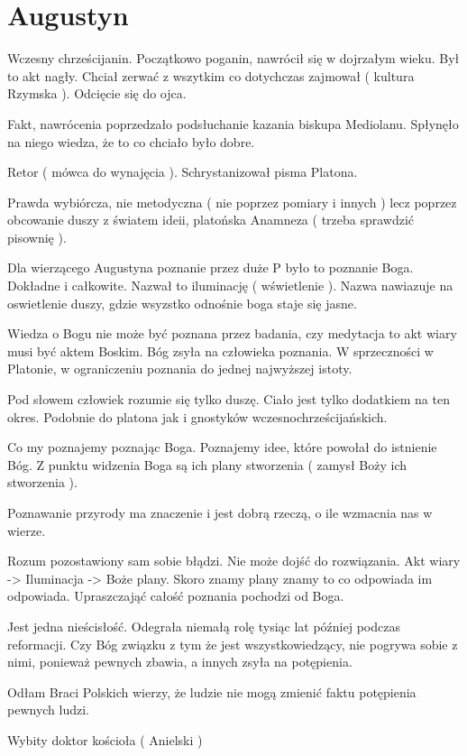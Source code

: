 \documentclass[11pt]{article}
\begin{document}
\section{Augustyn}
Wczesny chrześcijanin. Początkowo poganin, nawrócił się w dojrzałym wieku. Był to akt nagły. 
Chciał zerwać z wszytkim co dotychczas zajmował ( kultura Rzymska ). 
Odcięcie się do ojca.

Fakt, nawrócenia poprzedzało podsłuchanie kazania biskupa Mediolanu. Spłynęło na niego wiedza, że to co chciało było dobre.


Retor ( mówca do wynajęcia ).
Schrystanizował pisma Platona.

Prawda wybiórcza, nie metodyczna ( nie poprzez pomiary i innych ) lecz poprzez obcowanie duszy z światem ideii, platońska Anamneza ( trzeba sprawdzić pisownię ).

Dla wierzącego Augustyna poznanie przez duże P było to poznanie Boga. Dokładne i całkowite. Nazwał to iluminację ( wświetlenie ). Nazwa nawiazuje na oswietlenie duszy, gdzie wsyzstko odnośnie boga staje się jasne.

Wiedza o Bogu nie może być poznana przez badania, czy medytacja to akt wiary musi być aktem Boskim. Bóg zsyła na człowieka poznania. W sprzeczności w Platonie, w ograniczeniu poznania do jednej najwyższej istoty.

Pod słowem człowiek rozumie się tylko duszę. Ciało jest tylko dodatkiem na ten okres. Podobnie do platona jak i gnostyków wczesnochrześcijańskich. 

Co my poznajemy poznając Boga. Poznajemy idee, które powołał do istnienie Bóg. Z punktu widzenia Boga są ich plany stworzenia ( zamysł Boży ich stworzenia ). 

Poznawanie przyrody ma znaczenie i jest dobrą rzeczą, o ile wzmacnia nas w wierze.

Rozum pozostawiony sam sobie błądzi. Nie może dojść do rozwiązania. Akt wiary -> Iluminacja -> Boże plany. Skoro znamy plany znamy to co odpowiada im odpowiada.
Upraszczająć całość poznania pochodzi od Boga.

Jest jedna nieścisłość. Odegrała niemałą rolę tysiąc lat później podczas reformacji. Czy Bóg związku z tym że jest wszystkowiedzący, nie pogrywa sobie z nimi, ponieważ pewnych zbawia, a innych zsyła na potępienia.

Odłam Braci Polskich wierzy, że ludzie nie mogą zmienić faktu potępienia pewnych ludzi. 

Wybity doktor kościoła ( Anielski )
\end{document}
